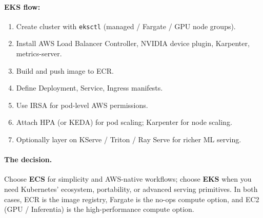 \documentclass[11pt,a4paper]{article}
\begin{document}
\paragraph{EKS flow:}
\begin{enumerate}[leftmargin=*,nosep]
    \item Create cluster with \texttt{eksctl} (managed / Fargate / GPU node groups).
    \item Install AWS Load Balancer Controller, NVIDIA device plugin,
          Karpenter, metrics-server.
    \item Build and push image to ECR.
    \item Define Deployment, Service, Ingress manifests.
    \item Use IRSA for pod-level AWS permissions.
    \item Attach HPA (or KEDA) for pod scaling; Karpenter for node scaling.
    \item Optionally layer on KServe / Triton / Ray Serve for richer ML serving.
\end{enumerate}

\paragraph{The decision.} Choose \textbf{ECS} for simplicity and AWS-native
workflows; choose \textbf{EKS} when you need Kubernetes' ecosystem, portability,
or advanced serving primitives. In both cases, ECR is the image registry,
Fargate is the no-ops compute option, and EC2 (GPU / Inferentia) is the
high-performance compute option.
\end{document}
